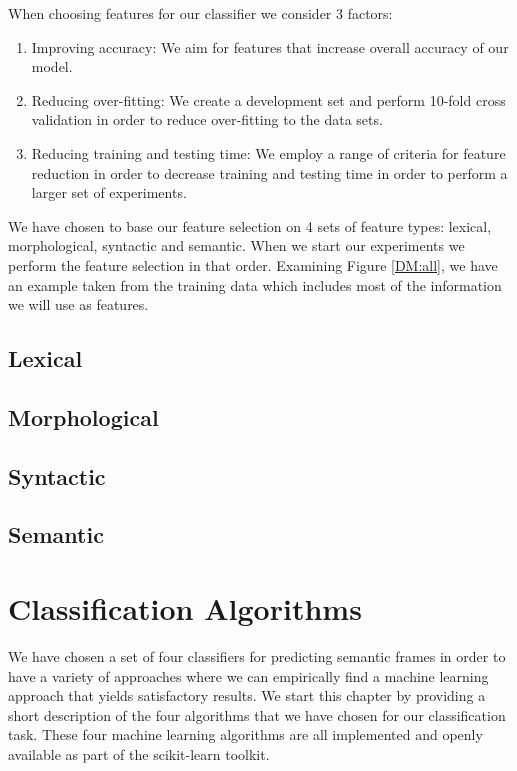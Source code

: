 When choosing features for our classifier we consider 3 factors:

\begin{enumerate}
    \item Improving accuracy: We aim for features that increase overall accuracy of our model.
    \item Reducing over-fitting: We create a development set and perform 10-fold cross validation in order to reduce over-fitting to the data sets.
    \item Reducing training and testing time: We employ a range of criteria for feature reduction in order to decrease training and testing time in order to perform a larger set of experiments.
\end{enumerate}

We have chosen to base our feature selection on 4 sets of feature types: lexical, morphological, syntactic and semantic. When we start our experiments we perform the feature selection in that order. Examining Figure \ref{DM:all}, we have an example taken from the training data which includes most of the information we will use as features. 

\subsection{Lexical}

\subsection{Morphological}

\subsection{Syntactic}

\subsection{Semantic}

 
\section{Classification Algorithms}

We have chosen a set of four classifiers for predicting semantic frames in order to have a variety of approaches where we can empirically find a machine learning approach that yields satisfactory results. We start this chapter by providing a short description of the four algorithms that we have chosen for our classification task. These four machine learning algorithms are all implemented and openly available as part of the scikit-learn toolkit.

